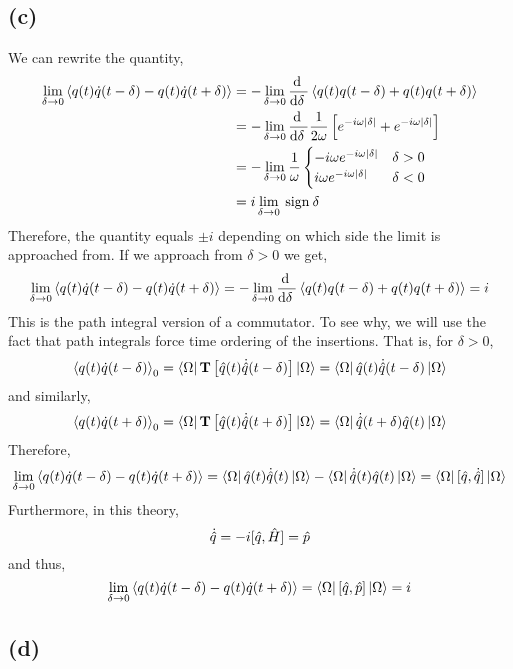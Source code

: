 \documentclass[12pt]{article}
\begin{document}
\subsection{(c)}

We can rewrite the quantity,
\begin{align*}
\lim_{\delta \to 0} \left<  q(t) \dot{q}(t - \delta) - q(t) \dot{q}(t + \delta) \right> & = -\lim_{\delta \to 0} \frac{\mathrm{d} \:}{\mathrm{d}\delta \:} \left<  q(t) q(t - \delta) + q(t) q(t + \delta) \right>
\\
& = -\lim_{\delta \to 0} \frac{\mathrm{d} \:}{\mathrm{d}\delta \:} \frac{1}{2 \omega} \left[ e^{-i \omega |\delta| } + e^{-i \omega |\delta| }  \right]
\\
& = - \lim_{\delta \to 0}  \frac{1}{\omega}
\begin{cases}
-i\omega e^{- i \omega |\delta| } & \delta > 0
\\
i \omega e^{- i \omega |\delta| } & \delta < 0
\end{cases}
\\
& = i \lim_{\delta \to 0} \: \mathrm{sign}\:{\delta}
\end{align*}
Therefore, the quantity equals $\pm i$ depending on which side the limit is approached from. If we approach from $\delta > 0$ we get,
\[ \lim_{\delta \to 0} \left<  q(t) \dot{q}(t - \delta) - q(t) \dot{q}(t + \delta) \right> = -\lim_{\delta \to 0} \frac{\mathrm{d} \:}{\mathrm{d}\delta \:} \left<  q(t) q(t - \delta) + q(t) q(t + \delta) \right> = i \]
This is the path integral version of a commutator. To see why, we will use the fact that path integrals force time ordering of the insertions. That is, for $\delta > 0$,
\[ \left< q(t) \dot{q}(t - \delta) \right>_0 = \left< \Omega \right| \mathbf{T}\left[  \hat{q}(t) \dot{\hat{q}}(t - \delta)  \right] \left| \Omega \right> = \left< \Omega \right| \hat{q}(t) \dot{\hat{q}}(t - \delta)  \left| \Omega \right> \]
and similarly,
\[ \left< q(t) \dot{q}(t + \delta) \right>_0 = \left< \Omega \right| \mathbf{T}\left[  \hat{q}(t) \dot{\hat{q}}(t + \delta)  \right] \left| \Omega \right> = \left< \Omega \right| \dot{\hat{q}}(t + \delta) \hat{q}(t)  \left| \Omega \right> \]
Therefore,
\[ \lim_{\delta \to 0} \left<  q(t) \dot{q}(t - \delta) - q(t) \dot{q}(t + \delta) \right> = \left< \Omega \right| \hat{q}(t) \dot{\hat{q}}(t)  \left| \Omega \right> - \left< \Omega \right| \dot{\hat{q}}(t) \hat{q}(t)  \left| \Omega \right>  = \left< \Omega \right| [\hat{q}, \dot{\hat{q}} ] \left| \Omega \right> \]
Furthermore, in this theory,
\[ \dot{\hat{q}} = - i [\hat{q}, \hat{H}] = \hat{p} \]
and thus,
 \[ \lim_{\delta \to 0} \left<  q(t) \dot{q}(t - \delta) - q(t) \dot{q}(t + \delta) \right> = \left< \Omega \right| [\hat{q}, \hat{p} ] \left| \Omega \right> = i \]
\subsection{(d)}
\end{document}
